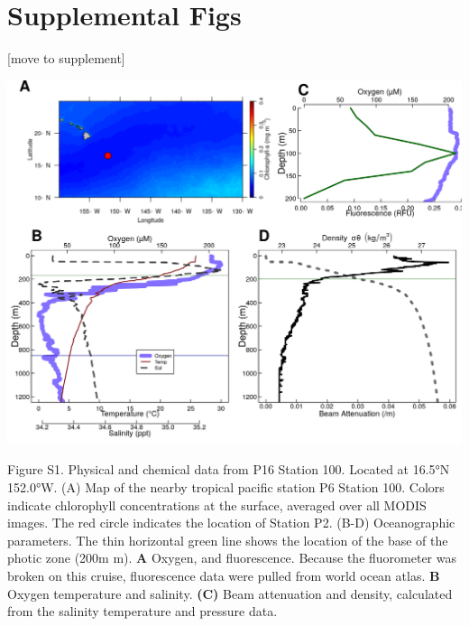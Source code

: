 \documentclass[]{article}
\begin{document}
\hypertarget{supplemental-figs}{%
\section{Supplemental Figs}\label{supplemental-figs}}

{[}move to supplement{]}

\includegraphics{../figures/CombinedP16S100Info.png}

Figure S1. Physical and chemical data from P16 Station 100. Located at
16.5°N 152.0°W. (A) Map of the nearby tropical pacific station P6
Station 100. Colors indicate chlorophyll concentrations at the surface,
averaged over all MODIS images. The red circle indicates the location of
Station P2. (B-D) Oceanographic parameters. The thin horizontal green
line shows the location of the base of the photic zone (200m m).
\textbf{A} Oxygen, and fluorescence. Because the fluorometer was broken
on this cruise, fluorescence data were pulled from world ocean atlas.
\textbf{B} Oxygen temperature and salinity. \textbf{(C)} Beam
attenuation and density, calculated from the salinity temperature and
pressure data.
\end{document}

